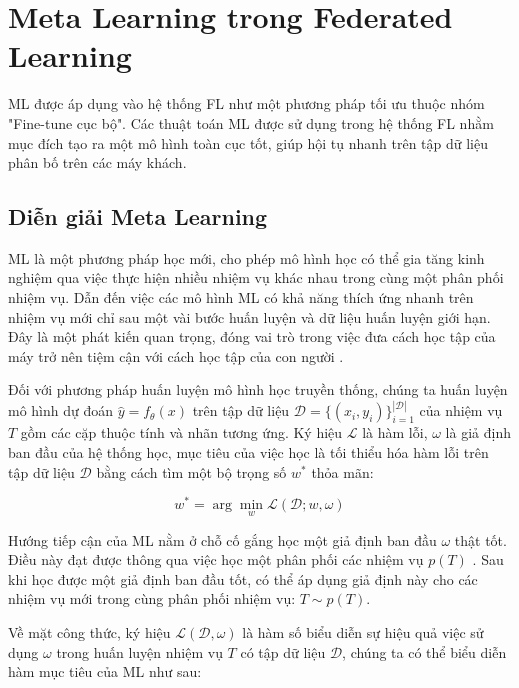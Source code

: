 \section{Meta Learning trong Federated Learning}

ML được áp dụng vào hệ thống FL như một phương pháp tối ưu thuộc nhóm "Fine-tune cục bộ". Các thuật toán ML được sử dụng trong hệ thống FL nhằm mục đích tạo ra một mô hình toàn cục tốt, giúp hội tụ nhanh trên tập dữ liệu phân bố trên các máy khách.

\subsection{Diễn giải Meta Learning}

ML là một phương pháp học mới, cho phép mô hình học có thể gia tăng kinh nghiệm qua việc thực hiện nhiều nhiệm vụ khác nhau trong cùng một phân phối nhiệm vụ. Dẫn đến việc các mô hình ML có khả năng thích ứng nhanh trên nhiệm vụ mới chỉ sau một vài bước huấn luyện và dữ liệu huấn luyện giới hạn. Đây là một phát kiến quan trọng, đóng vai trò trong việc đưa cách học tập của máy trở nên tiệm cận với cách học tập của con người \cite{harlow1949formation}.

Đối với phương pháp huấn luyện mô hình học truyền thống, chúng ta huấn luyện mô hình dự đoán $\hat{y} = f_\theta(x)$ trên tập dữ liệu $\mathcal{D} = \{ (x_i, y_i)\}_{i=1}^{|\mathcal{D}|}$ của nhiệm vụ $T$ gồm các cặp thuộc tính và nhãn tương ứng. Ký hiệu $\mathcal{L}$ là hàm lỗi, $\omega$ là giả định ban đầu của hệ thống học, mục tiêu của việc học là tối thiểu hóa hàm lỗi trên tập dữ liệu $\mathcal{D}$ bằng cách tìm một bộ trọng số $w^*$ thỏa mãn:

\begin{equation}
    w^* = \arg \min_w \mathcal{L}(\mathcal{D}; w, \omega)
\end{equation}

Hướng tiếp cận của ML nằm ở chỗ cố gắng học một giả định ban đầu $\omega$ thật tốt. Điều này đạt được thông qua việc học một phân phối các nhiệm vụ $p(T)$ \cite{hospedales2020meta}. Sau khi học được một giả định ban đầu tốt, có thể áp dụng giả định này cho các nhiệm vụ mới trong cùng phân phối nhiệm vụ: $T \sim p(T)$.

Về mặt công thức, ký hiệu $\mathcal{L}(\mathcal{D}, \omega)$ là hàm số biểu diễn sự hiệu quả việc sử dụng $\omega$ trong huấn luyện nhiệm vụ $T$ có tập dữ liệu $\mathcal{D}$, chúng ta có thể biểu diễn hàm mục tiêu của ML như sau:

